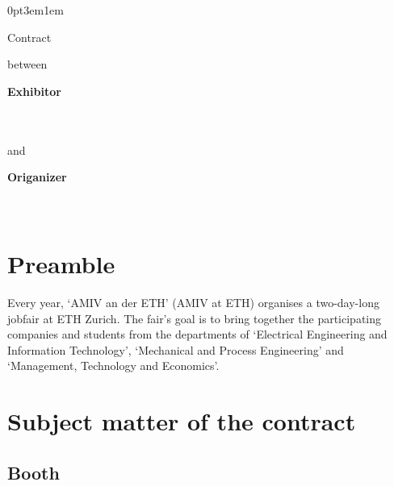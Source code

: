 \titlespacing*{\section}
{0pt}{3em}{1em}

\renewcommand*{\thesection}{\S\ \arabic{section}}

\begin{center}
\amivfairtitle
\bigbreak
\begin{huge}
Contract
\end{huge}
\medbreak
between
\bigbreak
\end{center}

\vspace{2cm}

\begin{minipage}[t]{0.4\textwidth}
\textbf{Exhibitor}
\bigbreak
\companyname\\
\companyaddress\\
\companycity\\
\companycountry
\end{minipage}%
\begin{minipage}[t]{0.2\textwidth}
and
\end{minipage}%
\begin{minipage}[t]{0.4\textwidth}
\textbf{Origanizer}
\bigbreak
\amivname\\
\amivaddress\\
\amivpostal\ \amivcity
\end{minipage}

\vfill
\section*{Preamble}

Every year, `AMIV an der ETH' (AMIV at ETH) organises a two-day-long jobfair at ETH
Zurich. The fair's goal is to bring together the participating companies and students
from the departments of `Electrical Engineering and Information Technology',
`Mechanical and Process Engineering' and `Management, Technology and Economics'.

\newpage
\section{Subject matter of the contract}
\subsection{Booth}

